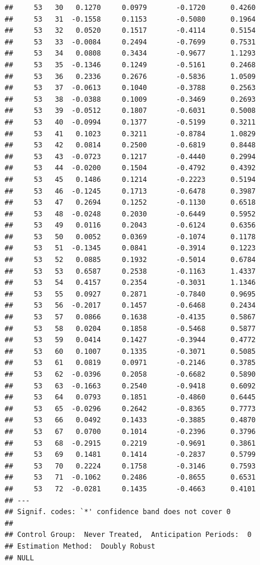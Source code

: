 \documentclass[
]{article}
\begin{document}
\begin{verbatim}
##     53   30   0.1270     0.0979       -0.1720      0.4260  
##     53   31  -0.1558     0.1153       -0.5080      0.1964  
##     53   32   0.0520     0.1517       -0.4114      0.5154  
##     53   33  -0.0084     0.2494       -0.7699      0.7531  
##     53   34   0.0808     0.3434       -0.9677      1.1293  
##     53   35  -0.1346     0.1249       -0.5161      0.2468  
##     53   36   0.2336     0.2676       -0.5836      1.0509  
##     53   37  -0.0613     0.1040       -0.3788      0.2563  
##     53   38  -0.0388     0.1009       -0.3469      0.2693  
##     53   39  -0.0512     0.1807       -0.6031      0.5008  
##     53   40  -0.0994     0.1377       -0.5199      0.3211  
##     53   41   0.1023     0.3211       -0.8784      1.0829  
##     53   42   0.0814     0.2500       -0.6819      0.8448  
##     53   43  -0.0723     0.1217       -0.4440      0.2994  
##     53   44  -0.0200     0.1504       -0.4792      0.4392  
##     53   45   0.1486     0.1214       -0.2223      0.5194  
##     53   46  -0.1245     0.1713       -0.6478      0.3987  
##     53   47   0.2694     0.1252       -0.1130      0.6518  
##     53   48  -0.0248     0.2030       -0.6449      0.5952  
##     53   49   0.0116     0.2043       -0.6124      0.6356  
##     53   50   0.0052     0.0369       -0.1074      0.1178  
##     53   51  -0.1345     0.0841       -0.3914      0.1223  
##     53   52   0.0885     0.1932       -0.5014      0.6784  
##     53   53   0.6587     0.2538       -0.1163      1.4337  
##     53   54   0.4157     0.2354       -0.3031      1.1346  
##     53   55   0.0927     0.2871       -0.7840      0.9695  
##     53   56  -0.2017     0.1457       -0.6468      0.2434  
##     53   57   0.0866     0.1638       -0.4135      0.5867  
##     53   58   0.0204     0.1858       -0.5468      0.5877  
##     53   59   0.0414     0.1427       -0.3944      0.4772  
##     53   60   0.1007     0.1335       -0.3071      0.5085  
##     53   61   0.0819     0.0971       -0.2146      0.3785  
##     53   62  -0.0396     0.2058       -0.6682      0.5890  
##     53   63  -0.1663     0.2540       -0.9418      0.6092  
##     53   64   0.0793     0.1851       -0.4860      0.6445  
##     53   65  -0.0296     0.2642       -0.8365      0.7773  
##     53   66   0.0492     0.1433       -0.3885      0.4870  
##     53   67   0.0700     0.1014       -0.2396      0.3796  
##     53   68  -0.2915     0.2219       -0.9691      0.3861  
##     53   69   0.1481     0.1414       -0.2837      0.5799  
##     53   70   0.2224     0.1758       -0.3146      0.7593  
##     53   71  -0.1062     0.2486       -0.8655      0.6531  
##     53   72  -0.0281     0.1435       -0.4663      0.4101  
## ---
## Signif. codes: `*' confidence band does not cover 0
## 
## Control Group:  Never Treated,  Anticipation Periods:  0
## Estimation Method:  Doubly Robust
## NULL
\end{verbatim}
\end{document}
